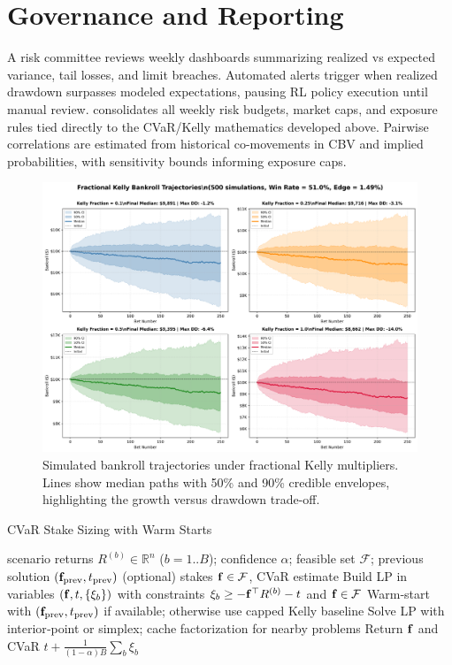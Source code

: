 \section{Governance and Reporting}


A risk committee reviews weekly dashboards summarizing realized vs expected variance, tail losses, and limit breaches. Automated alerts trigger when realized drawdown surpasses modeled expectations, pausing RL policy execution until manual review.  consolidates all weekly risk budgets, market caps, and exposure rules tied directly to the CVaR/Kelly mathematics developed above. Pairwise correlations are estimated from historical co-movements in CBV and implied probabilities, with sensitivity bounds informing exposure caps.

\begin{figure}[t]
  \centering
  \includegraphics[width=0.9\linewidth]{../figures/bankroll_trajectories.png}
  \caption[Fractional Kelly bankroll trajectories]{Simulated bankroll trajectories under fractional Kelly multipliers. Lines show median paths with 50\% and 90\% credible envelopes, highlighting the growth versus drawdown trade-off.}
  \label{fig:bankroll-trajectories}
\end{figure}

\begin{algorithm}[t]
  \caption{CVaR Stake Sizing with Warm Starts}
  \label{alg:cvar-solve}
  \begin{algorithmic}[1]
    \Require scenario returns $R^{(b)}\in\mathbb{R}^n$ ($b=1..B$); confidence $\alpha$; feasible set $\mathcal F$; previous solution $(\mathbf{f}_{\text{prev}},t_{\text{prev}})$ (optional)
    \Ensure stakes $\mathbf{f}\in\mathcal F$, CVaR estimate
    \State Build LP in variables $(\mathbf{f},t,\{\xi_b\})$ with constraints $\xi_b\ge-\mathbf{f}^\top R^{(b)}-t$ and $\mathbf{f}\in\mathcal F$
    \State Warm‑start with $(\mathbf{f}_{\text{prev}},t_{\text{prev}})$ if available; otherwise use capped Kelly baseline
    \State Solve LP with interior‑point or simplex; cache factorization for nearby problems
    \State Return $\mathbf{f}$ and CVaR $t+\frac{1}{(1-\alpha)B}\sum_b \xi_b$
  \end{algorithmic}
\end{algorithm}

